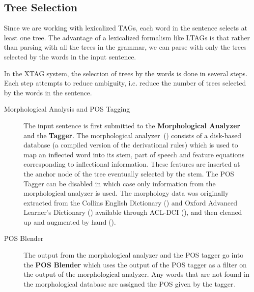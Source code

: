 \subsection{Tree Selection} 
 
Since we are working with lexicalized TAGs, each word in the sentence 
selects at least one tree. The advantage of a lexicalized formalism 
like LTAGs is that rather than parsing with all the trees in the 
grammar, we can parse with only the trees selected by the words in the 
input sentence. 
 
In the XTAG system, the selection of trees by the words is done in 
several steps. Each step attempts to reduce ambiguity, i.e. reduce the 
number of trees selected by the words in the sentence. 
 
\begin{description} 
\item[Morphological Analysis and POS Tagging] The input sentence is 
  first submitted to the {\bf Morphological Analyzer} and the {\bf     Tagger}. The morphological analyzer~(\cite{karp92}) consists of a 
  disk-based database (a compiled version of the derivational rules) 
  which is used to map an inflected word into its stem, part of speech 
  and feature equations corresponding to inflectional information. 
  These features are inserted at the anchor node of the tree 
  eventually selected by the stem. The POS Tagger can be disabled in 
  which case only information from the morphological analyzer is used. 
  The morphology data was originally extracted from the Collins 
  English Dictionary (\cite{ced79}) and Oxford Advanced Learner's 
  Dictionary (\cite{oald74}) available through ACL-DCI 
  (\cite{liberman89}), and then cleaned up and augmented by hand 
  (\cite{karp92}). 
    
\item[POS Blender] The output from the morphological analyzer and the 
  POS tagger go into the {\bf POS Blender} which uses the output of 
  the POS tagger as a filter on the output of the morphological 
  analyzer. Any words that are not found in the morphological database 
  are assigned the POS given by the tagger. 
  

\end{description}
